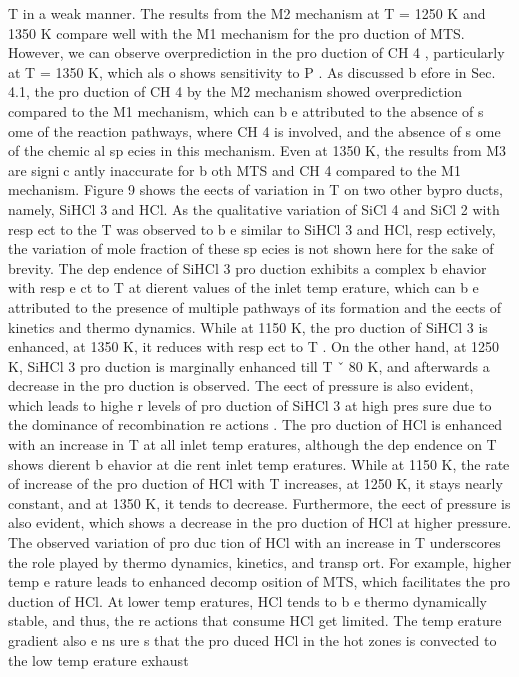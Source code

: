\documentclass[10pt, letterpaper]{article}
\begin{document}
T
in a weak manner.
The results from the M2 mechanism at
T
= 1250 K and 1350 K compare well with the M1 mechanism
for the pro duction of MTS. However, we can observe overprediction in the pro duction of CH
4
, particularly
at
T
= 1350 K, which als o shows sensitivity to
P
. As discussed b efore in Sec. 4.1, the pro duction of CH
4
by
the M2 mechanism showed overprediction compared to the M1 mechanism, which can b e attributed to the
absence of s ome of the reaction pathways, where CH
4
is involved, and the absence of s ome of the chemic al
sp ecies in this mechanism. Even at 1350 K, the results from M3 are signic antly inaccurate for b oth MTS
and CH
4
compared to the M1 mechanism.
Figure 9 shows the eects of variation in 
T
on two other bypro ducts, namely, SiHCl
3
and HCl. As the
qualitative variation of SiCl
4
and SiCl
2
with resp ect to the 
T
was observed to b e similar to SiHCl
3
and
HCl, resp ectively, the variation of mole fraction of these sp ecies is not shown here for the sake of brevity.
The dep endence of SiHCl
3
pro duction exhibits a complex b ehavior with resp e ct to 
T
at dierent values
of the inlet temp erature, which can b e attributed to the presence of multiple pathways of its formation and
the eects of kinetics and thermo dynamics. While at 1150 K, the pro duction of SiHCl
3
is enhanced, at
1350 K, it reduces with resp ect to 
T
. On the other hand, at 1250 K, SiHCl
3
pro duction is marginally
enhanced till 
T
ˇ
80 K, and afterwards a decrease in the pro duction is observed. The eect of pressure is
also evident, which leads to highe r levels of pro duction of SiHCl
3
at high pres sure due to the dominance of
recombination re actions .
The pro duction of HCl is enhanced with an increase in 
T
at all inlet temp eratures, although the
dep endence on 
T
shows dierent b ehavior at die rent inlet temp eratures. While at 1150 K, the rate of
increase of the pro duction of HCl with 
T
increases, at 1250 K, it stays nearly constant, and at 1350 K, it
tends to decrease. Furthermore, the eect of pressure is also evident, which shows a decrease in the pro duction
of HCl at higher pressure. The observed variation of pro duc tion of HCl with an increase in 
T
underscores
the role played by thermo dynamics, kinetics, and transp ort. For example, higher temp e rature leads to
enhanced decomp osition of MTS, which facilitates the pro duction of HCl. At lower temp eratures, HCl tends
to b e thermo dynamically stable, and thus, the re actions that consume HCl get limited. The temp erature
gradient also e ns ure s that the pro duced HCl in the hot zones is convected to the low temp erature exhaust
\end{document}
